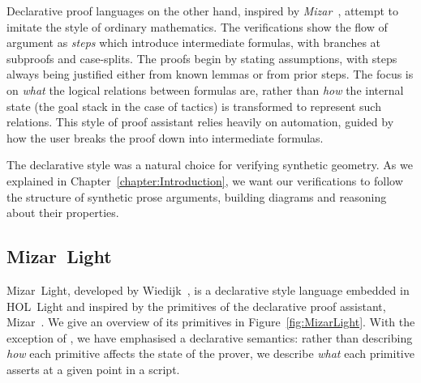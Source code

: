 Declarative proof languages on the other hand, inspired by \emph{Mizar}~\cite{MizarMathematicalVernacular}, attempt to imitate the style of ordinary mathematics. The verifications show the flow of argument as \emph{steps} which introduce intermediate formulas, with branches at subproofs and case-splits. The proofs begin by stating assumptions, with steps always being justified either from known lemmas or from prior steps. The focus is on \emph{what} the logical relations between formulas are, rather than \emph{how} the internal state (the goal stack in the case of tactics) is transformed to represent such relations. This style of proof assistant relies heavily on automation, guided by how the user breaks the proof down into intermediate formulas.

The declarative style was a natural choice for verifying synthetic geometry. As we explained in Chapter~\ref{chapter:Introduction}, we want our verifications to follow the structure of synthetic prose arguments, building diagrams and reasoning about their properties.

\subsection{Mizar~Light}\label{sec:MizarLight}
Mizar~Light, developed by Wiedijk~\cite{MizarLight}, is a declarative style language embedded in HOL~Light and inspired by the primitives of the declarative proof assistant, Mizar~\cite{MizarMathematicalVernacular}. We give an overview of its primitives in Figure~\ref{fig:MizarLight}. With the exception of , we have emphasised a declarative semantics: rather than describing \emph{how} each primitive affects the state of the prover, we describe \emph{what} each primitive asserts at a given point in a script.

